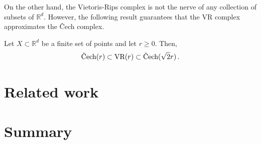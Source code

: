 \documentclass[../main.tex]{subfiles}
\begin{document}
On the other hand, the Vietoris-Rips complex is not the nerve of any collection of subsets of $\mathbb{R}^d$. However, the following result guarantees that the VR complex approximates the \v{C}ech complex.

\begin{lemma}
\label{ref:lemaVR}
Let $X \subset \mathbb{R}^d$ be a finite set of points and let $r \geq 0$. Then,
\[
\text{\rm \v{C}ech}(r) \subset \text{\rm VR}(r) \subset \text{\rm \v{C}ech}(\sqrt{2}r)\,.
\]
\end{lemma}








\section{Related work}





\section{Summary}

\end{document}
